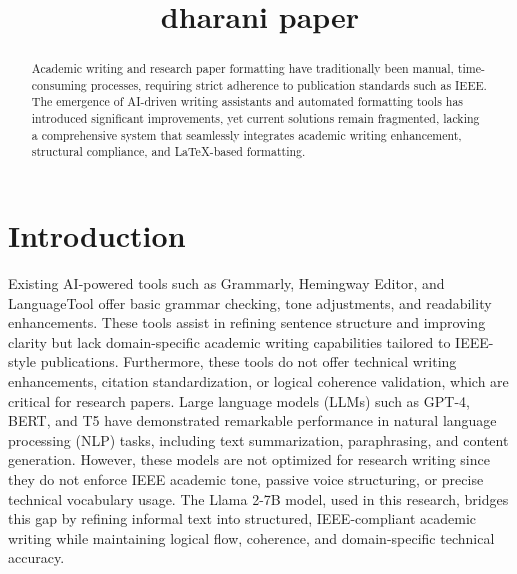 \documentclass[conference]{IEEEtran}
\title{dharani paper}
\author{
  \IEEEauthorblockN{krithy \and shandeep}
  \IEEEauthorblockA{SLIIT \and SLIIT \\[0.5ex]
  KRITHU@gmail.com \and shandeep@gmail.com}
}
\begin{document}
\maketitle

\begin{abstract}
Academic writing and research paper formatting have traditionally been manual, time-consuming processes, requiring strict adherence to publication standards such as IEEE. The emergence of AI-driven writing assistants and automated formatting tools has introduced significant improvements, yet current solutions remain fragmented, lacking a comprehensive system that seamlessly integrates academic writing enhancement, structural compliance, and LaTeX-based formatting.
\end{abstract}




  \section{Introduction}
  Existing AI-powered tools such as Grammarly, Hemingway Editor, and LanguageTool offer basic grammar checking, tone adjustments, and readability enhancements. These tools assist in refining sentence structure and improving clarity but lack domain-specific academic writing capabilities tailored to IEEE-style publications. Furthermore, these tools do not offer technical writing enhancements, citation standardization, or logical coherence validation, which are critical for research papers.
Large language models (LLMs) such as GPT-4, BERT, and T5 have demonstrated remarkable performance in natural language processing (NLP) tasks, including text summarization, paraphrasing, and content generation. However, these models are not optimized for research writing since they do not enforce IEEE academic tone, passive voice structuring, or precise technical vocabulary usage. The Llama 2-7B model, used in this research, bridges this gap by refining informal text into structured, IEEE-compliant academic writing while maintaining logical flow, coherence, and domain-specific technical accuracy.

  
    
\end{document}
